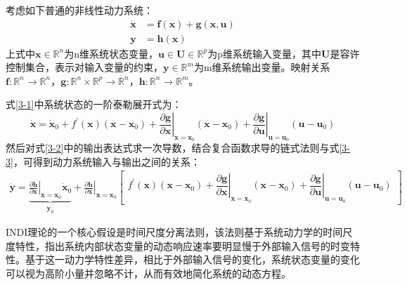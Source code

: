 考虑如下普通的非线性动力系统：
\begin{align}
    \dot{\boldsymbol{x}}&=\boldsymbol{f}(\boldsymbol{x})+\boldsymbol{g}(\boldsymbol{x},\boldsymbol{u}) \label{3-1}
    \\
    \boldsymbol{y}&=\boldsymbol{h}(\boldsymbol{x})\label{3-2}
\end{align}
上式中$\boldsymbol{x}\in\mathbb{R}^{n}$为n维系统状态变量，$\boldsymbol{u}\in\boldsymbol{U}\in\mathbb{R}^{p}$为p维系统输入变量，其中$\boldsymbol{U}$是容许控制集合，表示对输入变量的约束，$\boldsymbol{y}\in\mathbb{R}^{m}$为m维系统输出变量。映射关系$\boldsymbol{f}:\mathbb{R}^n\rightarrow\mathbb{R}^n$，$\boldsymbol{g}:\mathbb{R}^n\times\mathbb{R}^p\rightarrow\mathbb{R}^n$，$\boldsymbol{h}:\mathbb{R}^n\rightarrow\mathbb{R}^m$。

式\eqref{3-1}中系统状态的一阶泰勒展开式为：
\begin{equation}
    \dot{\boldsymbol{x}}=\dot{\boldsymbol{x}}_0+f^{\prime}(\boldsymbol{x})(\boldsymbol{x}-\boldsymbol{x}_0)+\left.\frac{\partial \boldsymbol{g}}{\partial \boldsymbol{x}}\right|_{\boldsymbol{x}=\boldsymbol{x}_0}(\boldsymbol{x}-\boldsymbol{x}_0)+\left.\frac{\partial \boldsymbol{g}}{\partial \boldsymbol{u}}\right|_{\boldsymbol{u}=\boldsymbol{u}_0}(\boldsymbol{u}-\boldsymbol{u}_0)
    \label{3-3}
\end{equation}
然后对式\eqref{3-2}中的输出表达式求一次导数，结合复合函数求导的链式法则与式\eqref{3-3}，可得到动力系统输入与输出之间的关系：
\begin{equation}
    \begin{aligned}
    \dot{\boldsymbol{y}} = \underbrace{\left.\frac{\partial\boldsymbol{h}}{\partial\boldsymbol{x}}\right|_{\boldsymbol{x}=\boldsymbol{x}_0}\dot{\boldsymbol{x}}_0}_{\dot{\boldsymbol{y}}_0} + \left.\frac{\partial \boldsymbol{h}}{\partial \boldsymbol{x}}\right|_{\boldsymbol{x}=\boldsymbol{x}_0}\begin{bmatrix}f^{\prime}(\boldsymbol{x})(\boldsymbol{x}-\boldsymbol{x}_0)+\left.\dfrac{\partial \boldsymbol{g}}{\partial \boldsymbol{x}}\right|_{\boldsymbol{x}=\boldsymbol{x}_0}(\boldsymbol{x}-\boldsymbol{x}_0)+\left.\dfrac{\partial \boldsymbol{g}}{\partial \boldsymbol{u}}\right|_{\boldsymbol{u}=\boldsymbol{u}_0}(\boldsymbol{u}-\boldsymbol{u}_0)\end{bmatrix}
    \end{aligned}
    \label{3-4}
\end{equation}

INDI理论的一个核心假设是时间尺度分离法则\cite{pfeifle2021energy}，该法则基于系统动力学的时间尺度特性，指出系统内部状态变量的动态响应速率要明显慢于外部输入信号的时变特性。基于这一动力学特性差异，相比于外部输入信号的变化，系统状态变量的变化可以视为高阶小量并忽略不计，从而有效地简化系统的动态方程。

